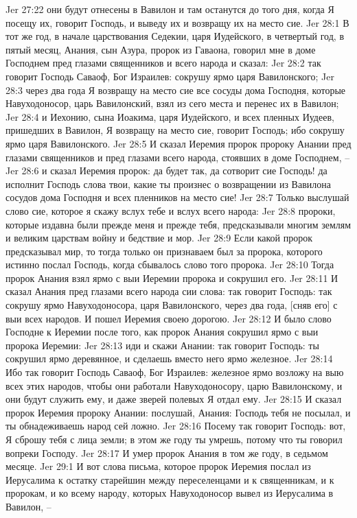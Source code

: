 Jer 27:22  они будут отнесены в Вавилон и там останутся до того дня, когда Я посещу их, говорит Господь, и выведу их и возвращу их на место сие.
Jer 28:1  В тот же год, в начале царствования Седекии, царя Иудейского, в четвертый год, в пятый месяц, Анания, сын Азура, пророк из Гаваона, говорил мне в доме Господнем пред глазами священников и всего народа и сказал:
Jer 28:2  так говорит Господь Саваоф, Бог Израилев: сокрушу ярмо царя Вавилонского;
Jer 28:3  через два года Я возвращу на место сие все сосуды дома Господня, которые Навуходоносор, царь Вавилонский, взял из сего места и перенес их в Вавилон;
Jer 28:4  и Иехонию, сына Иоакима, царя Иудейского, и всех пленных Иудеев, пришедших в Вавилон, Я возвращу на место сие, говорит Господь; ибо сокрушу ярмо царя Вавилонского.
Jer 28:5  И сказал Иеремия пророк пророку Анании пред глазами священников и пред глазами всего народа, стоявших в доме Господнем, --
Jer 28:6  и сказал Иеремия пророк: да будет так, да сотворит сие Господь! да исполнит Господь слова твои, какие ты произнес о возвращении из Вавилона сосудов дома Господня и всех пленников на место сие!
Jer 28:7  Только выслушай слово сие, которое я скажу вслух тебе и вслух всего народа:
Jer 28:8  пророки, которые издавна были прежде меня и прежде тебя, предсказывали многим землям и великим царствам войну и бедствие и мор.
Jer 28:9  Если какой пророк предсказывал мир, то тогда только он признаваем был за пророка, которого истинно послал Господь, когда сбывалось слово того пророка.
Jer 28:10  Тогда пророк Анания взял ярмо с выи Иеремии пророка и сокрушил его.
Jer 28:11  И сказал Анания пред глазами всего народа сии слова: так говорит Господь: так сокрушу ярмо Навуходоносора, царя Вавилонского, через два года, [сняв его] с выи всех народов. И пошел Иеремия своею дорогою.
Jer 28:12  И было слово Господне к Иеремии после того, как пророк Анания сокрушил ярмо с выи пророка Иеремии:
Jer 28:13  иди и скажи Анании: так говорит Господь: ты сокрушил ярмо деревянное, и сделаешь вместо него ярмо железное.
Jer 28:14  Ибо так говорит Господь Саваоф, Бог Израилев: железное ярмо возложу на выю всех этих народов, чтобы они работали Навуходоносору, царю Вавилонскому, и они будут служить ему, и даже зверей полевых Я отдал ему.
Jer 28:15  И сказал пророк Иеремия пророку Анании: послушай, Анания: Господь тебя не посылал, и ты обнадеживаешь народ сей ложно.
Jer 28:16  Посему так говорит Господь: вот, Я сброшу тебя с лица земли; в этом же году ты умрешь, потому что ты говорил вопреки Господу.
Jer 28:17  И умер пророк Анания в том же году, в седьмом месяце.
Jer 29:1  И вот слова письма, которое пророк Иеремия послал из Иерусалима к остатку старейшин между переселенцами и к священникам, и к пророкам, и ко всему народу, которых Навуходоносор вывел из Иерусалима в Вавилон, --
